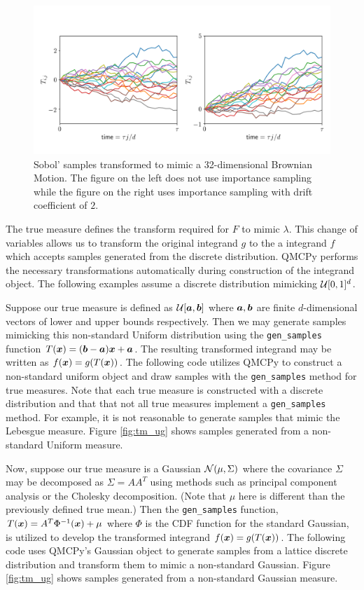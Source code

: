 \documentclass[graybox,footinfo]{svmult}
\begin{document}
\begin{figure}
	\includegraphics[width=1\textwidth]{QMCSoftwareArticle/figs/tm_bm.png} 
	\caption{Sobol' samples transformed to mimic a 32-dimensional Brownian Motion. The figure on the left does not use importance sampling while the figure on the right uses importance sampling with drift coefficient of $2$.}
	\label{fig:tm_bm}
\end{figure}

\iffalse

The true measure defines the transform required for $F$ to mimic $\lambda$. This change of variables allows us to transform the original integrand $g$ to the a integrand $f$ which accepts samples generated from the discrete distribution. QMCPy performs the necessary transformations automatically during construction of the integrand object. The following examples assume a discrete distribution mimicking ${\mathcal{U}}[0,1]^d$. 

Suppose our true measure is defined as ${\mathcal{U}}[{\boldsymbol{a}},{\boldsymbol{b}}]$ where ${\boldsymbol{a}},{\boldsymbol{b}}$ are finite $d$-dimensional vectors of lower and upper bounds respectively. Then we may generate samples mimicking this non-standard Uniform distribution using the \texttt{gen\_samples} function $T({\boldsymbol{x}}) = ({\boldsymbol{b}}-{\boldsymbol{a}}){\boldsymbol{x}} + {\boldsymbol{a}}$. The resulting transformed integrand may be written as $f({\boldsymbol{x}}) = g(T({\boldsymbol{x}}))$. The following code utilizes QMCPy to construct a non-standard uniform object and draw samples with the \texttt{gen\_samples} method for true measures.  Note that each true measure is constructed with a discrete distribution and that that not all true measures implement a \texttt{gen\_samples} method. For example, it is not reasonable to generate samples that mimic the Lebesgue measure. Figure \ref{fig:tm_ug} shows samples generated from a non-standard Uniform measure. 



Now, suppose our true measure is a Gaussian ${\mathcal{N}}(\mu,\Sigma)$ where the covariance $\Sigma$ may be decomposed as $\Sigma=AA^T$ using methods such as principal component analysis or the Cholesky decomposition. (Note that $\mu$ here is different than the previously defined true mean.) Then the \texttt{gen\_samples} function, $T({\boldsymbol{x}}) = A^T \Phi^{-1}({\boldsymbol{x}}) + \mu$ where $\Phi$ is the CDF function for the standard Gaussian, is utilized to develop the transformed integrand $f({\boldsymbol{x}}) = g(T({\boldsymbol{x}}))$. The following code uses QMCPy's Gaussian object to generate samples from a lattice discrete distribution and transform them to mimic a non-standard Gaussian. Figure \ref{fig:tm_ug} shows samples generated from a non-standard Gaussian measure.   
\end{document}
